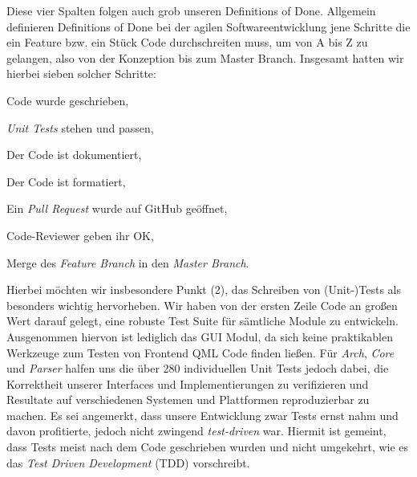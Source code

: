 Diese vier Spalten folgen auch grob unseren Definitions of Done. Allgemein
definieren Definitions of Done bei der agilen Softwareentwicklung jene Schritte
die ein Feature bzw. ein Stück Code durchschreiten muss, um von A bis Z zu
gelangen, also von der Konzeption bis zum Master Branch. Insgesamt hatten wir
hierbei sieben solcher Schritte:

\begin{senumerate}{-0.5cm}
  \item Code wurde geschrieben,
  \item \emph{Unit Tests} stehen und passen,
  \item Der Code ist dokumentiert,
  \item Der Code ist formatiert,
  \item Ein \emph{Pull Request} wurde auf GitHub geöffnet,
  \item Code-Reviewer geben ihr OK,
  \item Merge des \emph{Feature Branch} in den \emph{Master Branch}.
\end{senumerate}

Hierbei möchten wir insbesondere Punkt (2), das Schreiben von (Unit-)Tests als
besonders wichtig hervorheben. Wir haben von der ersten Zeile Code an großen
Wert darauf gelegt, eine robuste Test Suite für sämtliche Module zu entwickeln.
Ausgenommen hiervon ist lediglich das GUI Modul, da sich keine praktikablen
Werkzeuge zum Testen von Frontend QML Code finden ließen. Für \emph{Arch},
\emph{Core} und \emph{Parser} halfen uns die über 280 individuellen Unit Tests
jedoch dabei, die Korrektheit unserer Interfaces und Implementierungen zu
verifizieren und Resultate auf verschiedenen Systemen und Plattformen
reproduzierbar zu machen. Es sei angemerkt, dass unsere Entwicklung zwar Tests
ernst nahm und davon profitierte, jedoch nicht zwingend \emph{test-driven} war.
Hiermit ist gemeint, dass Tests meist nach dem Code  geschrieben wurden und
nicht umgekehrt, wie es das \emph{Test Driven Development} (TDD) vorschreibt.
